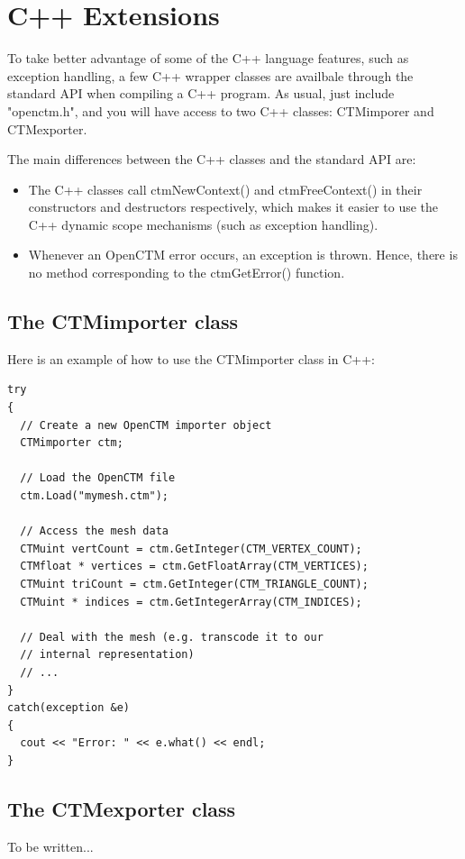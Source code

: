 
\chapter{C++ Extensions}
To take better advantage of some of the C++ language features, such as
exception handling, a few C++ wrapper classes are availbale through the standard
API when compiling a C++ program. As usual, just include "openctm.h", and you
will have access to two C++ classes: CTMimporer and CTMexporter.

The main differences between the C++ classes and the standard API are:

\begin{itemize}
    \item The C++ classes call ctmNewContext() and ctmFreeContext() in their
          constructors and destructors respectively, which makes it easier to
          use the C++ dynamic scope mechanisms (such as exception handling).
    \item Whenever an OpenCTM error occurs, an exception is thrown. Hence, there
          is no method corresponding to the ctmGetError() function.
\end{itemize}

\section{The CTMimporter class}

Here is an example of how to use the CTMimporter class in C++:

\begin{lstlisting}
try
{
  // Create a new OpenCTM importer object
  CTMimporter ctm;

  // Load the OpenCTM file
  ctm.Load("mymesh.ctm");

  // Access the mesh data
  CTMuint vertCount = ctm.GetInteger(CTM_VERTEX_COUNT);
  CTMfloat * vertices = ctm.GetFloatArray(CTM_VERTICES);
  CTMuint triCount = ctm.GetInteger(CTM_TRIANGLE_COUNT);
  CTMuint * indices = ctm.GetIntegerArray(CTM_INDICES);

  // Deal with the mesh (e.g. transcode it to our
  // internal representation)
  // ...
}
catch(exception &e)
{
  cout << "Error: " << e.what() << endl;
}
\end{lstlisting}


\section{The CTMexporter class}
To be written...



